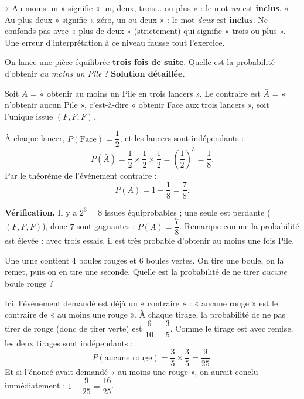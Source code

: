 \documentclass[11pt]{article}
\newcounter{popsec}
\newcounter{popsub}
\newcommand{\courssub}[1]{%
  \stepcounter{popsub}%
  \par\vspace{9pt}\noindent{\popxbold\fontsize{11.5}{13}\selectfont\color{popink}{\color{poporange}\thepopsec.\thepopsub}\hspace{6pt}#1}\par\nopagebreak\vspace{4pt}
}
\begin{document}
\begin{attention}
« Au moins un » signifie « un, deux, trois... ou plus » : le mot \emph{un} est \textbf{inclus}. « Au plus deux » signifie « zéro, un ou deux » : le mot \emph{deux} est \textbf{inclus}. Ne confonds pas avec « plus de deux » (strictement) qui signifie « trois ou plus ». Une erreur d'interprétation à ce niveau fausse tout l'exercice.
\end{attention}

\courssub{Exemples variés d'application}

\begin{exoresolu}
On lance une pièce équilibrée \textbf{trois fois de suite}. Quelle est la probabilité d'obtenir \emph{au moins un Pile} ?
\tcblower
\textbf{Solution détaillée.}

Soit $A$ = « obtenir au moins un Pile en trois lancers ». Le contraire est $\bar{A}$ = « n'obtenir aucun Pile », c'est-à-dire « obtenir Face aux trois lancers », soit l'unique issue $(F, F, F)$.

À chaque lancer, $P(\text{Face}) = \dfrac{1}{2}$, et les lancers sont indépendants :
\[ P(\bar{A}) = \frac{1}{2} \times \frac{1}{2} \times \frac{1}{2} = \left(\frac{1}{2}\right)^3 = \frac{1}{8}. \]
Par le théorème de l'événement contraire :
\[ P(A) = 1 - \frac{1}{8} = \frac{7}{8}. \]

\textbf{Vérification.} Il y a $2^3 = 8$ issues équiprobables ; une seule est perdante ($(F,F,F)$), donc $7$ sont gagnantes : $P(A) = \dfrac{7}{8}$. Remarque comme la probabilité est élevée : avec trois essais, il est très probable d'obtenir au moins une fois Pile.
\end{exoresolu}

\begin{exemplebox}
Une urne contient $4$ boules rouges et $6$ boules vertes. On tire une boule, on la remet, puis on en tire une seconde. Quelle est la probabilité de ne tirer \emph{aucune} boule rouge ?

Ici, l'événement demandé est déjà un « contraire » : « aucune rouge » est le contraire de « au moins une rouge ». À chaque tirage, la probabilité de ne pas tirer de rouge (donc de tirer verte) est $\dfrac{6}{10} = \dfrac{3}{5}$. Comme le tirage est avec remise, les deux tirages sont indépendants :
\[ P(\text{aucune rouge}) = \frac{3}{5} \times \frac{3}{5} = \frac{9}{25}. \]
Et si l'énoncé avait demandé « au moins une rouge », on aurait conclu immédiatement : $1 - \dfrac{9}{25} = \dfrac{16}{25}$.
\end{exemplebox}
\end{document}
